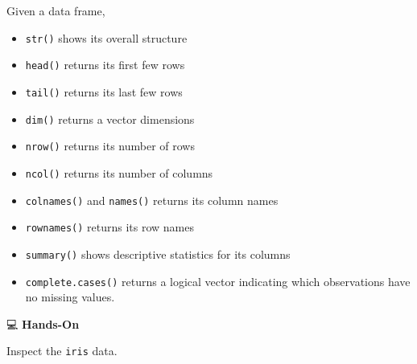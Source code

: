 \documentclass[
  letterpaper,
  DIV=11,
  numbers=noendperiod]{scrreprt}
\begin{document}
Given a data frame,

\begin{itemize}
\item
  \texttt{str()} shows its overall structure
\item
  \texttt{head()} returns its first few rows
\item
  \texttt{tail()} returns its last few rows
\item
  \texttt{dim()} returns a vector dimensions
\item
  \texttt{nrow()} returns its number of rows
\item
  \texttt{ncol()} returns its number of columns
\item
  \texttt{colnames()} and \texttt{names()} returns its column names
\item
  \texttt{rownames()} returns its row names
\item
  \texttt{summary()} shows descriptive statistics for its columns
\item
  \texttt{complete.cases()} returns a logical vector indicating which
  observations have no missing values.
\end{itemize}

💻 \textbf{Hands-On}

Inspect the \texttt{iris} data.
\end{document}
